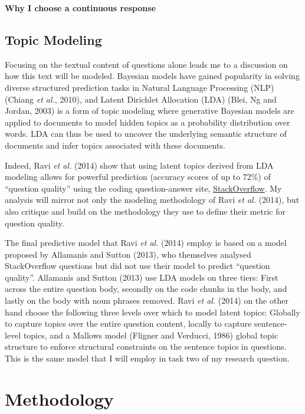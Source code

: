 \documentclass[11pt,preprint, authoryear]{article}
\numberwithin{equation}{section}
\numberwithin{figure}{section}
\begin{document}
\textbf{Why I choose a continuous response}

\subsection{\texorpdfstring{Topic Modeling
\label{model_lit}}{Topic Modeling }}\label{topic-modeling}

Focusing on the textual content of questions alone leads me to a
discussion on how this text will be modeled. Bayesian models have gained
popularity in solving diverse structured prediction tasks in Natural
Language Processing (NLP) (Chiang \emph{et al.}, 2010), and Latent
Dirichlet Allocation (LDA) (Blei, Ng and Jordan, 2003) is a form of
topic modeling where generative Bayesian models are applied to documents
to model hidden topics as a probability distribution over words. LDA can
thus be used to uncover the underlying semantic structure of documents
and infer topics associated with these documents.

Indeed, Ravi \emph{et al.} (2014) show that using latent topics derived
from LDA modeling allows for powerful prediction (accuracy scores of up
to 72\%) of ``question quality'' using the coding question-answer site,
\href{https://stackoverflow.com}{StackOverflow}. My analysis will mirror
not only the modeling methodology of Ravi \emph{et al.} (2014), but also
critique and build on the methodology they use to define their metric
for question quality.

The final predictive model that Ravi \emph{et al.} (2014) employ is
based on a model proposed by Allamanis and Sutton (2013), who themselves
analysed StackOverflow questions but did not use their model to predict
``question quality''. Allamanis and Sutton (2013) use LDA models on
three tiers: First across the entire question body, secondly on the code
chunks in the body, and lastly on the body with noun phrases removed.
Ravi \emph{et al.} (2014) on the other hand choose the following three
levels over which to model latent topics: Globally to capture topics
over the entire question content, locally to capture sentence-level
topics, and a Mallows model (Fligner and Verducci, 1986) global topic
structure to enforce structural constraints on the sentence topics in
questions. This is the same model that I will employ in task two of my
research question.

\newpage 

\color{black}

\section{\texorpdfstring{Methodology
\label{Method}}{Methodology }}\label{methodology}
\end{document}
